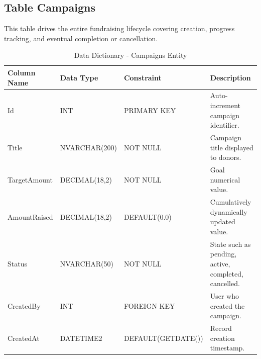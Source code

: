 \documentclass{thesis-library}
\begin{document}
\subsection{Table Campaigns}
{\RaggedRight
This table drives the entire fundraising lifecycle covering creation, progress tracking, and eventual completion or cancellation.\par}
\begin{table}[H]
    \centering
    \caption{Data Dictionary - Campaigns Entity}
    \vspace{10pt}
    \begin{tabularx}{\linewidth}{|l|l|l|L|}
        \hline
        \textbf{Column Name} & \textbf{Data Type} & \textbf{Constraint} & \textbf{Description} \\
        \hline
        Id & INT & PRIMARY KEY & Auto-increment campaign identifier. \\
        \hline
        Title & NVARCHAR(200) & NOT NULL & Campaign title displayed to donors. \\
        \hline
        TargetAmount & DECIMAL(18,2) & NOT NULL & Goal numerical value. \\
        \hline
        AmountRaised & DECIMAL(18,2) & DEFAULT(0.0) & Cumulatively dynamically updated value. \\
        \hline
        Status & NVARCHAR(50) & NOT NULL & State such as pending, active, completed, cancelled. \\
        \hline
        CreatedBy & INT & FOREIGN KEY & User who created the campaign. \\
        \hline
        CreatedAt & DATETIME2 & DEFAULT(GETDATE()) & Record creation timestamp. \\
        \hline
    \end{tabularx}
\end{table}
\end{document}
